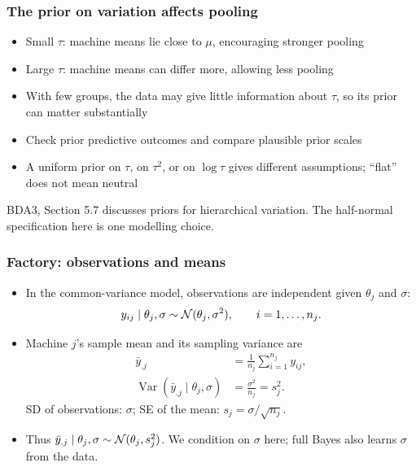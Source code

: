 \documentclass[10pt]{beamer}
\begin{document}
\begin{frame}
\frametitle{The prior on variation affects pooling}

  \begin{itemize}
  \item Small $\tau$: machine means lie close to $\mu$, encouraging
    stronger pooling
  \item Large $\tau$: machine means can differ more, allowing less pooling
  \item With few groups, the data may give little information about
    $\tau$, so its prior can matter substantially
  \item Check prior predictive outcomes and compare plausible prior scales
  \item A uniform prior on $\tau$, on $\tau^2$, or on $\log\tau$
    gives different assumptions; ``flat'' does not mean neutral
  \end{itemize}
  \medskip
  {\small BDA3, Section 5.7 discusses priors for hierarchical variation.
    The half-normal specification here is one modelling choice.}
\end{frame}

\begin{frame}
\frametitle{Factory: observations and means}

  \begin{itemize}
  \item In the common-variance model, observations are independent
    given $\theta_j$ and $\sigma$:
    \[
      y_{ij}\mid\theta_j,\sigma\sim\mathcal{N}(\theta_j,\sigma^2),
      \qquad i=1,\ldots,n_j.
    \]
  \item Machine $j$'s sample mean and its sampling variance are
    \begin{align*}
      \bar y_{.j}&=\frac{1}{n_j}\sum_{i=1}^{n_j}y_{ij},\\
      \operatorname{Var}(\bar y_{.j}\mid\theta_j,\sigma)
        &=\frac{\sigma^2}{n_j}=s_j^2.
    \end{align*}
    SD of observations: $\sigma$; SE of the mean: $s_j=\sigma/\sqrt{n_j}$.
    \pause
  \item Thus $\bar y_{.j}\mid\theta_j,\sigma\sim\mathcal{N}(\theta_j,s_j^2)$.
    We condition on $\sigma$ here; full Bayes also learns $\sigma$
    from the data.
  \end{itemize}
\end{frame}
\end{document}
